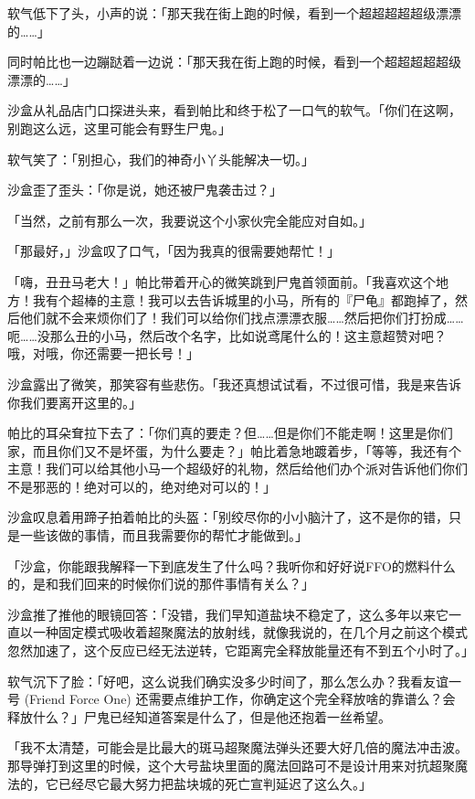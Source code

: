 软气低下了头，小声的说：「那天我在街上跑的时候，看到一个超超超超超级漂漂的……」

同时帕比也一边蹦跶着一边说：「那天我在街上跑的时候，看到一个超超超超超级漂漂的……」

\horizonline


沙盒从礼品店门口探进头来，看到帕比和终于松了一口气的软气。「你们在这啊，别跑这么远，这里可能会有野生尸鬼。」

软气笑了：「别担心，我们的神奇小丫头能解决一切。」

沙盒歪了歪头：「你是说，她还被尸鬼袭击过？」

「当然，之前有那么一次，我要说这个小家伙完全能应对自如。」

「那最好，」沙盒叹了口气，「因为我真的很需要她帮忙！」

「嗨，丑丑马老大！」帕比带着开心的微笑跳到尸鬼首领面前。「我喜欢这个地方！我有个超棒的主意！我可以去告诉城里的小马，所有的『尸龟』都跑掉了，然后他们就不会来烦你们了！我们可以给你们找点漂漂衣服……然后把你们打扮成……呃……没那么丑的小马，然后改个名字，比如说鸢尾什么的！这主意超赞对吧？哦，对哦，你还需要一把长号！」

沙盒露出了微笑，那笑容有些悲伤。「我还真想试试看，不过很可惜，我是来告诉你我们要离开这里的。」

帕比的耳朵耷拉下去了：「你们真的要走？但……但是你们不能走啊！这里是你们家，而且你们又不是坏蛋，为什么要走？」帕比着急地踱着步，「等等，我还有个主意！我们可以给其他小马一个超级好的礼物，然后给他们办个派对告诉他们你们不是邪恶的！绝对可以的，绝对绝对可以的！」

沙盒叹息着用蹄子拍着帕比的头盔：「别绞尽你的小小脑汁了，这不是你的错，只是一些该做的事情，而且我需要你的帮忙才能做到。」

「沙盒，你能跟我解释一下到底发生了什么吗？我听你和好好说FFO的燃料什么的，是和我们回来的时候你们说的那件事情有关么？」

沙盒推了推他的眼镜回答：「没错，我们早知道盐块不稳定了，这么多年以来它一直以一种固定模式吸收着超聚魔法的放射线，就像我说的，在几个月之前这个模式忽然加速了，这个反应已经无法逆转，它距离完全释放能量还有不到五个小时了。」

软气沉下了脸：「好吧，这么说我们确实没多少时间了，那么怎么办？我看友谊一号 (Friend Force One) 还需要点维护工作，你确定这个完全释放啥的靠谱么？会释放什么？」尸鬼已经知道答案是什么了，但是他还抱着一丝希望。

「我不太清楚，可能会是比最大的斑马超聚魔法弹头还要大好几倍的魔法冲击波。那导弹打到这里的时候，这个大号盐块里面的魔法回路可不是设计用来对抗超聚魔法的，它已经尽它最大努力把盐块城的死亡宣判延迟了这么久。」

